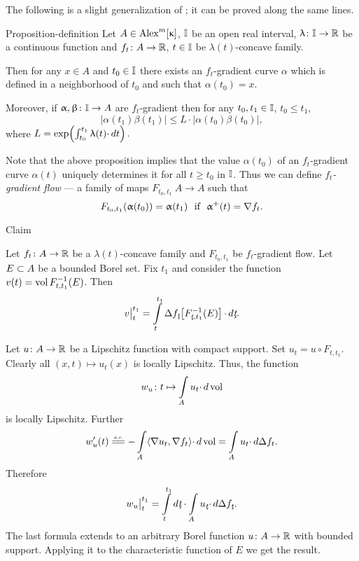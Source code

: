 \documentclass[oneside,a4paper]{article}
\begin{document}
The following is a slight generalization of \cite[2.1.2$\&$2.2(2)]{petrunin:survey}; it can be proved along the same lines.

\begin{thm}{Proposition-definition}\label{prop-def}
Let $A\in\CBB m\kappa$,
$\mathbb{I}$ be an open real interval, 
$\uplambda\colon\mathbb{I}\to\mathbb{R}$ be a continuous function and 
$f_t\colon A\to \mathbb{R}$, $t\in \mathbb{I}$ be $\lambda(t)$-concave family.

Then for any $x\in A$ and $t_0\in \mathbb{I}$ there exists an $f_t$-gradient curve $\alpha$ which is defined in a neighborhood of $t_0$ and such that $\alpha(t_0)=x$.

Moreover, if $\upalpha,\upbeta\colon\mathbb{I}\to A$ are $f_t$-gradient then for any $t_0,t_1\in\mathbb{I}$, $t_0\le t_1$,
$$|\alpha(t_1)\beta(t_1)|\le L{\cdot}|\alpha(t_0)\beta(t_0)|,$$
where $L=\exp\!\left(\int_{t_0}^{t_1}\uplambda(t){\cdot}\,d t\right).$
\end{thm}

Note that the above proposition implies that the value $\alpha(t_0)$ of an $f_t$-gradient curve $\alpha(t)$ uniquely determines it for all $t\ge t_0$ in $\mathbb{I}$. 
Thus we can define \emph{$f_t$-gradient flow} --- a family of maps $F_{{t_0},{t_1}}\: A\to A$ such that
$$F_{{t_0},{t_1}}(\alpha(t_0))=\alpha(t_1)\ \ \t{if}\ \ \alpha^+(t)=\nabla f_t.$$

\begin{thm}{Claim}\label{vol-lap}
{\sloppy Let $f_t\colon A\to\mathbb{R}$ be a $\lambda(t)$-concave family and $F_{{t_0},{t_1}}$ be $f_t$-gradient flow.
Let $E\subset A$ be a bounded Borel set. 
Fix $t_1$ and consider the function 
\hbox{$v(t)=\mathop{\rm vol}\nolimits F^{-1}_{{t},{t_1}}(E)$}.
Then 
$$\bigl.v\bigr|_t^{t_1}
=
\int\limits_t^{t_1}\Lap f_\under{t}\l[F^{-1}_{\under{t},{t_1}}(E)\r]{\cdot}\,d\under{t}.$$

}
\end{thm}

Let $u\colon A\to\mathbb{R}$ be a Lipschitz function with compact support.
Set $u_t=u\circ F_{{t},{t_1}}$.
Clearly all $(x,t)\mapsto u_t(x)$ is locally Lipschitz.
Thus, the function 
$$w_u\colon t\mapsto \int\limits_A u_t{\cdot}\,d\mathop{\rm vol}\nolimits$$ 
is locally Lipschitz.
Further
$$w_u'(t)\ae
-\int\limits_A \<\nabla u_t,\nabla f_t\>{\cdot}\,d\vol
=
\int\limits_A u_t{\cdot}\, d\Lap f_t.$$
Therefore 
$$\bigl.w_u\bigr|_t^{t_1}
=
\int\limits_t^{t_1}d\under{t}\cdot\int\limits_A u_{\under{t}}{\cdot}\,d\Lap f_{\under{t}}.$$
The last formula extends to an arbitrary Borel function $u\colon A\to\mathbb{R}$ with bounded support.
Applying it to the characteristic function of $E$ we get the result.
\qeds
\end{document}
